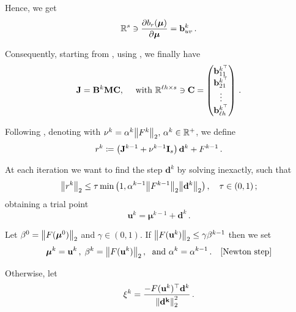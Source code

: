 Hence, we get 
\begin{equation}\label{eq:Jsecond}
    \mathbb{R}^{s} \ni \pdv{b_r(\boldsymbol{\mu})}{\boldsymbol{\mu}}=\mathbf{b}_{uv}^{k}\,.
\end{equation}

Consequently, starting from , using , we finally have
\begin{equation}\label{eq:genJ_explicit}
    \mathbf{J} = \mathbf{B}^k \mathbf{M} \mathbf{C}, 
    \quad \text{ with } \mathbb{R}^{\ell h \times s} \ni \mathbf{C}=\begin{pmatrix}
        \mathbf{b}_{11}^{k^\top}\\
        \mathbf{b}_{21}^{k^\top}\\
        \vdots \\
        \mathbf{b}_{\ell h}^{k^\top}  
    \end{pmatrix}\,. 
\end{equation}

Following , denoting with $\nu^k=\alpha^k\norm{F^k}_2, \, \alpha^k \in \mathbb{R}^+$, we define
\begin{equation}\label{eq:regN1}
    r^k \coloneqq \left( \mathbf{J}^{k-1} + \nu^{k-1} \mathbf{I}_s \right) \mathbf{d}^{k} + F^{k-1}\,.
\end{equation}

At each iteration we want to find the step $\mathbf{d}^k$ by solving  inexactly, such that
\begin{equation}
    \norm{r^k}_2 \leq \tau \min{\left(1, \alpha^{k-1} \norm{F^{k-1}}_2 \norm{\mathbf{d}^k}_2\right)}\,, \quad \tau \in (0,1)\,;
\end{equation}
obtaining a trial point
\begin{equation}\label{eq:regN_trial}
    \mathbf{u}^k = \boldsymbol{\mu}^{k-1} + \mathbf{d}^k\,.
\end{equation}

Let $\beta^0=\norm{F(\boldsymbol{\mu}^0)}_2$ and $\gamma \in (0,1)$.
If $\norm{F(\mathbf{u}^k)}_2\leq \gamma \beta^{k-1}$ then we set
\begin{equation}\label{eq:Newton_step}
    \boldsymbol{\mu}^{k} = \mathbf{u}^k\,, \; \beta^{k}=\norm{F(\mathbf{u}^k)}_2\,, \; \text{ and } \alpha^{k}=\alpha^{k-1}\,. \quad \text{[Newton step]}
\end{equation}

Otherwise, let 
\begin{equation}\label{eq:safeguard_ratio}
    \xi^k = \frac{- F(\mathbf{u}^k)^\top \mathbf{d}^k}{\norm{\mathbf{d^k}}_2^2}\, . 
\end{equation}

